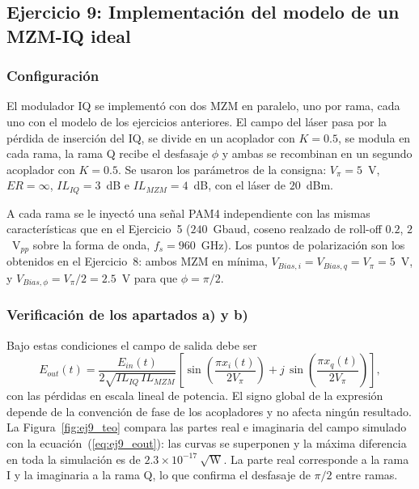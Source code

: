 \subsection*{Ejercicio 9: Implementación del modelo de un MZM-IQ ideal}

\subsubsection*{Configuración}

El modulador IQ se implementó con dos MZM en paralelo, uno por rama, cada
uno con el modelo de los ejercicios anteriores. El campo del láser pasa por
la pérdida de inserción del IQ, se divide en un acoplador con $K = 0.5$, se
modula en cada rama, la rama Q recibe el desfasaje $\phi$ y ambas se
recombinan en un segundo acoplador con $K = 0.5$. Se usaron los parámetros
de la consigna: $V_\pi = 5$~V, $ER = \infty$, $IL_{IQ} = 3$~dB e
$IL_{MZM} = 4$~dB, con el láser de $20$~dBm.

A cada rama se le inyectó una señal PAM4 independiente con las mismas
características que en el Ejercicio~5 ($240$~Gbaud, coseno realzado de
roll-off $0.2$, $2$~V$_{pp}$ sobre la forma de onda, $f_s = 960$~GHz). Los
puntos de polarización son los obtenidos en el Ejercicio~8: ambos MZM en
mínima, $V_{Bias,i} = V_{Bias,q} = V_\pi = 5$~V, y
$V_{Bias,\phi} = V_\pi/2 = 2.5$~V para que $\phi = \pi/2$.

\subsubsection*{Verificación de los apartados a) y b)}

Bajo estas condiciones el campo de salida debe ser
%
\begin{equation}
E_{out}(t) = \frac{E_{in}(t)}{2\sqrt{IL_{IQ}\,IL_{MZM}}}
\left[\sin\!\left(\frac{\pi x_i(t)}{2V_\pi}\right)
+ j\,\sin\!\left(\frac{\pi x_q(t)}{2V_\pi}\right)\right],
\label{eq:ej9_eout}
\end{equation}
%
con las pérdidas en escala lineal de potencia. El signo global de la
expresión depende de la convención de fase de los acopladores y no afecta
ningún resultado. La Figura~\ref{fig:ej9_teo} compara las partes real e
imaginaria del campo simulado con la ecuación~(\ref{eq:ej9_eout}): las
curvas se superponen y la máxima diferencia en toda la simulación es de
$2.3\times10^{-17}~\sqrt{\text{W}}$. La
parte real corresponde a la rama I y la imaginaria a la rama Q, lo que
confirma el desfasaje de $\pi/2$ entre ramas.

